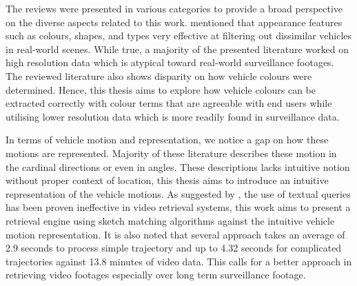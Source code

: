 The reviews were presented in various categories to provide a broad perspective on the diverse aspects related to this work. 
 mentioned that appearance features such as colours, shapes, and types very effective at filtering out dissimilar vehicles in real-world scenes. 
While true, a majority of the presented literature worked on high resolution data which is atypical toward real-world surveillance footages.
The reviewed literature also shows disparity on how vehicle colours were determined.
Hence, this thesis aims to explore how vehicle colours can be extracted correctly with colour terms that are agreeable with end users while utilising lower resolution data which is more readily found in surveillance data.

In terms of vehicle motion and representation, we notice a gap on how these motions are represented. Majority of these literature describes these motion in the cardinal directions or even in angles. These descriptions lacks intuitive notion without proper context of location, this thesis aims to introduce an intuitive representation of the vehicle motions.
As suggested by \cite{bhaumik2016hybrid}, the use of textual queries has been proven ineffective in video retrieval systems, this work aims to present a retrieval engine using sketch matching algorithms against the intuitive vehicle motion representation. It is also noted that several approach takes an average of 2.9 seconds to process simple trajectory and up to 4.32 seconds for complicated trajectories against 13.8 minutes of video data. This calls for a better approach in retrieving video footages especially over long term surveillance footage.


%

